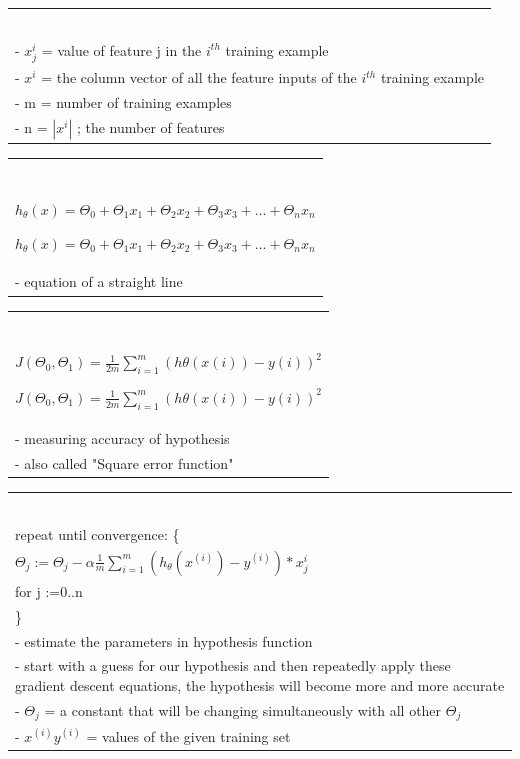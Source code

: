 \documentclass[a4paper,12pt,ngerman,fleqn]{article}
\newcommand{\mybox}[3]{
        \centering
        \begin{tabularx}{0.9\textwidth}{|X|}
            \rowcolor{accent}
            \rule{0pt}{20pt}
            \textcolor{white}{\textbf{#1}} \\
            \def\temp{#2}\ifx\temp\empty
                
            \else
                #2 \\ \hline
            \fi
            #3
            \\ \hline
        \end{tabularx}
    }
\begin{document}
    \begin{minipage}[t]{.51\textwidth}
        \vspace{1pt}
        \mybox
            {Variables}
            {}
            {
                - \(x_{j}^i\) = value of feature j in the \(i^{th}\) training example \\
                - \(x^i\) = the column vector of all the feature inputs of the \(i^{th}\) training example \\
                - m = number of training examples \\
                - n = \(|x^i|\) ; the number of features
            }
        \newline
        \newline
        \newline
        \mybox
            {Hypothesis function}
            {\( h_{\theta}(x) = \Theta_{0} + \Theta_{1}x_{1} + \Theta_{2}x_{2} + \Theta_{3}x_{3} + ... + \Theta_{n}x_{n} \)}
            {
                - equation of a straight line
            }
        \newline
        \newline
        \newline
        \mybox
            {Cost function}
            {\( J(\Theta_{0}, \Theta_{1}) = \frac{1}{2m} \sum\limits_{i=1}^{m} (h\theta(x{(i)}) - y{(i)})^2 \)}
            {
                - measuring accuracy of hypothesis \\
                - also called "Square error function"
            }
        \newline
        \newline
        \newline
        \mybox
            {Gradient Descent}  
            {} 
            {
                repeat until convergence: \{ \\
                \( \Theta_{j} := \Theta_{j} - \alpha \frac{1}{m} \sum\limits_{i=1}^{m} (h_\theta(x^{(i)}) - y^{(i)}) * x^{i}_j \) \\
                for j :=0..n \\
                \} \\ \hline 
                - estimate the parameters in hypothesis function \\
                - start with a guess for our hypothesis and then repeatedly apply these gradient descent equations, the hypothesis will become more and more accurate \\
                - \( \Theta_j \) = a constant that will be changing simultaneously with all other \( \Theta_j \) \\
                - \( x^{(i)} y^{(i)} \) = values of the given training set
            }
        \newline
    \end{minipage}%
\end{document}
